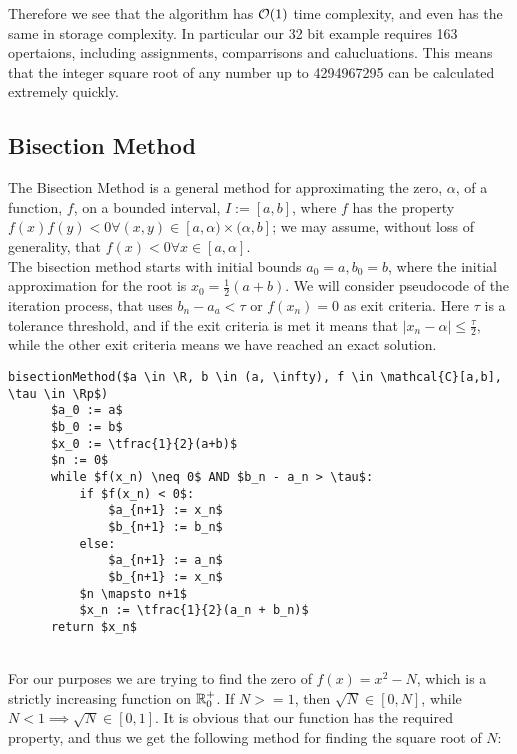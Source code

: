 Therefore we see that the algorithm has \(\mathcal{O}(1)\) time complexity, and even has the same in storage complexity. In particular our 32 bit example requires 163 opertaions, including assignments, comparrisons and calucluations. This means that the integer square root of any number up to 4294967295 can be calculated extremely quickly.

\subsection{Bisection Method}
\label{SUB_"Bisection Method for Roots"}
\theoremstyle{plain}
\newtheorem{Bisection Converges}{Proposition}[subsection]

The Bisection Method is a general method for approximating the zero, \(\alpha\), of a function, \(f\), on a bounded interval, \(I := [a,b]\), where \(f\) has the property \(f(x)f(y) < 0 \forall (x,y) \in [a,\alpha)\times(\alpha, b]\); we may assume, without loss of generality, that \(f(x) < 0 \forall x \in [a, \alpha]\).\\

The bisection method starts with initial bounds \(a_0 = a, b_0 = b\), where the initial approximation for the root is \(x_0 = \frac{1}{2}(a+b)\). We will consider pseudocode of the iteration process, that uses \(b_n - a_a < \tau\) or \(f(x_n) = 0\) as exit criteria. Here \(\tau\) is a tolerance threshold, and if the exit criteria is met it means that \(|x_n - \alpha| \le \frac{\tau}{2}\), while the other exit criteria means we have reached an exact solution.\\

\label{PCD_"General Bisection Method"}
\begin{lstlisting}[frame=single,mathescape,caption={General Bisection Method}]
  bisectionMethod($a \in \R, b \in (a, \infty), f \in \mathcal{C}[a,b], \tau \in \Rp$)
      $a_0 := a$
      $b_0 := b$
      $x_0 := \tfrac{1}{2}(a+b)$
	  $n := 0$
	  while $f(x_n) \neq 0$ AND $b_n - a_n > \tau$:
          if $f(x_n) < 0$:
              $a_{n+1} := x_n$
              $b_{n+1} := b_n$
          else:
              $a_{n+1} := a_n$
              $b_{n+1} := x_n$
          $n \mapsto n+1$
          $x_n := \tfrac{1}{2}(a_n + b_n)$
      return $x_n$
\end{lstlisting}\\
		
For our purposes we are trying to find the zero of \(f(x) = x^2 - N\), which is a strictly increasing function on \(\mathbb{R}^+_0\). If \(N >= 1\), then \(\sqrt{N} \in [0, N]\), while \(N < 1 \implies \sqrt{N} \in [0, 1]\). It is obvious that our function has the required property, and thus we get the following method for finding the square root of \(N\):\\

